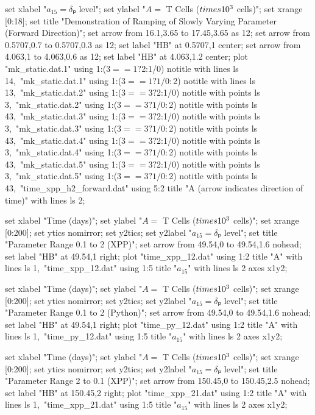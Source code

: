   set xlabel "$a_{15} = δₚ$ level";
  set ylabel "$A = $ T Cells ($\\times 10^3$ cells)";
  set xrange [0:18];
  set title "Demonstration of Ramping of Slowly Varying Parameter (Forward Direction)";
  set arrow from 16.1,3.65 to 17.45,3.65 as 12;
  set arrow from 0.5707,0.7 to 0.5707,0.3 as 12;
  set label "HB" at 0.5707,1 center;
  set arrow from 4.063,1 to 4.063,0.6 as 12;
  set label "HB" at 4.063,1.2 center;
  plot "mk_static.dat.1" using 1:($3==1?$2:1/0) notitle with lines ls 14,\
       "mk_static.dat.1" using 1:($3==1?1/0:$2) notitle with lines ls 13,\
       "mk_static.dat.2" using 1:($3==3?$2:1/0) notitle with points ls 3,\
       "mk_static.dat.2" using 1:($3==3?1/0:$2) notitle with points ls 43,\
       "mk_static.dat.3" using 1:($3==3?$2:1/0) notitle with points ls 3,\
       "mk_static.dat.3" using 1:($3==3?1/0:$2) notitle with points ls 43,\
       "mk_static.dat.4" using 1:($3==3?$2:1/0) notitle with points ls 3,\
       "mk_static.dat.4" using 1:($3==3?1/0:$2) notitle with points ls 43,\
       "mk_static.dat.5" using 1:($3==3?$2:1/0) notitle with points ls 3,\
       "mk_static.dat.5" using 1:($3==3?1/0:$2) notitle with points ls 43,\
       "time_xpp_h2_forward.dat" using 5:2 title "A (arrow indicates direction of time)" with lines ls 2;
\stopGNUPLOTscript

\startGNUPLOTscript[time_xpp_12]
  set xlabel "Time (days)";
  set ylabel "$A = $ T Cells ($\\times 10^3$ cells)";
  set xrange [0:200];
  set ytics nomirror;
  set y2tics;
  set y2label "$a_{15} = δₚ$ level";
  set title "Parameter Range 0.1 to 2 (XPP)";
  set arrow from 49.54,0 to 49.54,1.6 nohead;
  set label "HB" at 49.54,1 right;
  plot "time_xpp_12.dat" using 1:2 title "A" with lines ls 1,\
       "time_xpp_12.dat" using 1:5 title "$a_{15}$" with lines ls 2 axes x1y2;
\stopGNUPLOTscript

\startGNUPLOTscript[time_py_12]
  set xlabel "Time (days)";
  set ylabel "$A = $ T Cells ($\\times 10^3$ cells)";
  set xrange [0:200];
  set ytics nomirror;
  set y2tics;
  set y2label "$a_{15} = δₚ$ level";
  set title "Parameter Range 0.1 to 2 (Python)";
  set arrow from 49.54,0 to 49.54,1.6 nohead;
  set label "HB" at 49.54,1 right;
  plot "time_py_12.dat" using 1:2 title "A" with lines ls 1,\
       "time_py_12.dat" using 1:5 title "$a_{15}$" with lines ls 2 axes x1y2;
\stopGNUPLOTscript

\startGNUPLOTscript[time_xpp_21]
  set xlabel "Time (days)";
  set ylabel "$A = $ T Cells ($\\times 10^3$ cells)";
  set xrange [0:200];
  set ytics nomirror;
  set y2tics;
  set y2label "$a_{15} = δₚ$ level";
  set title "Parameter Range 2 to 0.1 (XPP)";
  set arrow from 150.45,0 to 150.45,2.5 nohead;
  set label "HB" at 150.45,2 right;
  plot "time_xpp_21.dat" using 1:2 title "A" with lines ls 1,\
       "time_xpp_21.dat" using 1:5 title "$a_{15}$" with lines ls 2 axes x1y2;
\stopGNUPLOTscript

